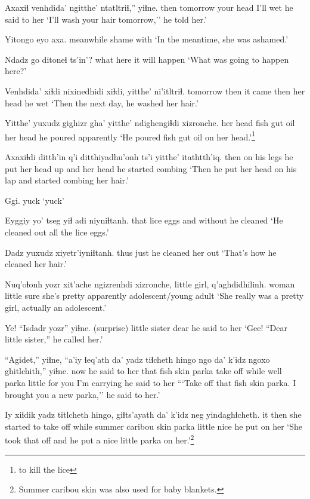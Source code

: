\documentclass[12pt]{article}
\begin{document}
\gll Axaxiɬ venhdida' ngitthe'  ntatltriɬ,'' yiɬne.
then   tomorrow  {your head} {I'll wet} {he said to her}
\glt `I'll wash your hair tomorrow,'' he told her.'
\glend

\gll Yitongo   eyo   axa. 
meanwhile shame with
\glt `In the meantime, she was ashamed.'
\glend

\gll Ndadz go ditoneɬ ts'in'?
what  here {it will happen}
\glt `What was going to happen here?'
\glend

\gll Venhdida' xiɬdi {nixinedhidi} xiɬdi, yitthe'  ni'itltriɬ.   
tomorrow  then  {it came}       then {her head} {he wet} 
\glt `Then the next day, he washed her hair.'
\glend

\gll Yitthe'  yuxudz gighizr  gha' yitthe' ndighengiɬdi xizronche.
{her head} {} {fish gut} oil {her head}  {he poured} apparently
\glt `He poured fish gut oil on her head.'\footnote{to kill the lice}
\glend

\gll Axaxiɬdi {ditth'in q'i} ditthiyadhu'onh  ts'i  yitthe'  itathtth'iq. 
then     {on his legs}  {he put her head up} and {her head} {he started combing}
\glt `Then he put her head on his lap and started combing her hair.'
\glend

\gll Ggi.
yuck
\glt `yuck'
\glend

\gll Eyggiy yo'  tseg yiɬ adi     niyniɬtanh.
that    lice eggs and  without {he cleaned }
\glt `He cleaned out all the lice eggs.'
\glend

\gll Dadz yuxudz xiyetr'iyniɬtanh. 
thus  just    {he cleaned her out}
\glt `That's how he cleaned her hair.'
\glend

\gll Nuq'oɬonh yozr   xit'ache ngizrenhdi xizronche, {little girl,}  q'aghdidhilinh.
woman     little sure     {she's pretty} apparently  {} {adolescent/young adult}
\glt `She really was a pretty girl, actually an adolescent.'
\glend

\gll Ye!  ``Isdadr        yozr'' yiɬne.
(surprise) {little sister} dear {he said to her}
\glt `Gee! ``Dear little sister,'' he called her.'
\glend

\gll ``Agidet,'' yiɬne, ``a'iy ɬeq'ath   da'   {yadz tiɬcheth} hingo ngo da'   k'idz  ngoxo   ghitlchith,'' yiɬne.
now     {he said to her} that {fish skin} parka {take off} while well parka little {for you} {I'm carrying} {he said to her}
\glt ```Take off that fish skin parka. I brought you a new parka,'' he said to her.'
\glend

\gll Iy xiɬdik {yadz titlcheth}    hingo, giɬts'ayath da'   k'idz  neg  yindaghɬcheth.
it then   {she started to take off} while {summer caribou skin}  parka little nice {he put on her}
\glt `She took that off and he put a nice little parka on her.'\footnote{Summer caribou skin was also used for baby blankets.}
\glend
\end{document}
